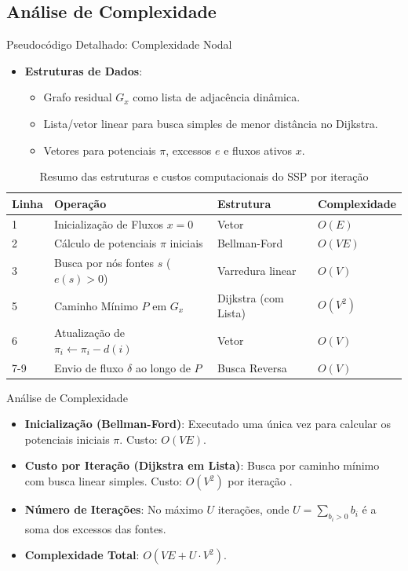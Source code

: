 \subsection{Análise de Complexidade}
\begin{frame}{Pseudocódigo Detalhado: Complexidade Nodal}
  \small
  \begin{itemize}
    \item \textbf{Estruturas de Dados}:
    \begin{itemize}
      \scriptsize
      \item Grafo residual $G_x$ como lista de adjacência dinâmica.
      \item Lista/vetor linear para busca simples de menor distância no Dijkstra.
      \item Vetores para potenciais $\pi$, excessos $e$ e fluxos ativos $x$.
    \end{itemize}
  \end{itemize}
  
  \begin{table}[h]
    \centering
    \tiny
    \begin{tabular}{llll}
      \toprule
      \textbf{Linha} & \textbf{Operação} & \textbf{Estrutura} & \textbf{Complexidade} \\
      \midrule
      1 & Inicialização de Fluxos $x=0$ & Vetor & $O(E)$ \\
      2 & Cálculo de potenciais $\pi$ iniciais & Bellman-Ford & $O(VE)$ \\
      3 & Busca por nós fontes $s$ ($e(s)>0$) & Varredura linear & $O(V)$ \\
      5 & Caminho Mínimo $P$ em $G_x$ & Dijkstra (com Lista) & $O(V^2)$ \\
      6 & Atualização de $\pi_i \leftarrow \pi_i - d(i)$ & Vetor & $O(V)$ \\
      7-9 & Envio de fluxo $\delta$ ao longo de $P$ & Busca Reversa & $O(V)$ \\
      \bottomrule
    \end{tabular}
    \caption{Resumo das estruturas e custos computacionais do SSP por iteração}
  \end{table}
\end{frame}

\begin{frame}{Análise de Complexidade}
  \begin{itemize}
    \setlength{\itemsep}{12pt}
    \item \textbf{Inicialização (Bellman-Ford)}: Executado uma única vez para calcular os potenciais iniciais $\pi$. Custo: $O(VE)$.
    \item \textbf{Custo por Iteração (Dijkstra em Lista)}: Busca por caminho mínimo com busca linear simples. Custo: $O(V^2)$ por iteração \cite{cormen2009introduction}.
    \item \textbf{Número de Iterações}: No máximo $U$ iterações, onde $U = \displaystyle\sum_{b_i > 0} b_i$ é a soma dos excessos das fontes.
    \item \textbf{Complexidade Total}: $O(VE + U \cdot V^2)$.
  \end{itemize}
\end{frame}


